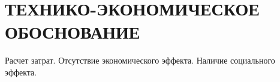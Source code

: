 \section[Технико-экономическое обоснование]{ТЕХНИКО-ЭКОНОМИЧЕСКОЕ ОБОСНОВАНИЕ}

Расчет затрат. Отсутствие экономического эффекта. Наличие социального эффекта.

